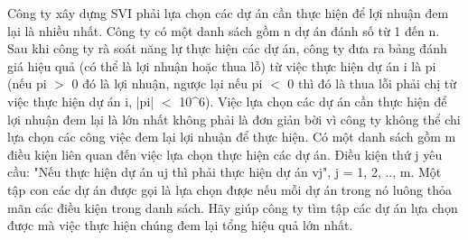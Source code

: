 Công ty xây dựng SVI phải lựa chọn các dự án cần thực hiện để lợi nhuận đem lại là nhiều nhất. Công ty có một danh sách gồm n dự án đánh số từ 1 đến n. Sau khi công ty rà soát năng lự thực hiện các dự án, công ty đưa ra bảng đánh giá hiệu quả (có thể là lợi nhuận hoặc thua lỗ) từ việc thực hiện dự án i là pi (nếu pi $>$ 0 đó là lợi nhuận, ngược lại nếu pi $<$ 0 thì đó là thua lỗi phải chị từ việc thực hiện dự án i, |pi| $<$ 10^6). Việc lựa chọn các dự án cần thực hiện để lợi nhuận đem lại là lớn nhất không phải là đơn giản bời vì công ty không thể chi lựa chọn các công việc đem lại lợi nhuận để thực hiện. Có một danh sách gồm m điều kiện liên quan đến việc lựa chọn thực hiện các dự án. Điều kiện thứ j yêu cầu: "Nếu thực hiện dự án uj thì phải thực hiện dự án vj", j = 1, 2, .., m. Một tập con các dự án được gọi là lựa chọn được nếu mỗi dự án trong nó luông thỏa mãn các điều kiện trong danh sách.
Hãy giúp công ty tìm tập các dự án lựa chọn được mà việc thực hiện chúng đem lại tổng hiệu quả lớn nhất.